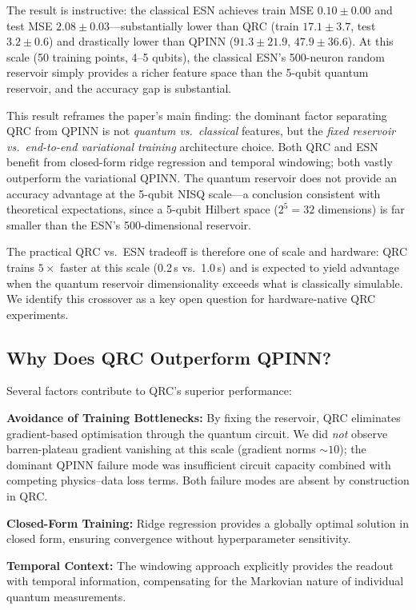 \documentclass[11pt,a4paper]{article}
\begin{document}
The result is instructive: the classical ESN achieves train MSE $0.10 \pm 0.00$ and test MSE $2.08 \pm 0.03$---substantially lower than QRC (train $17.1 \pm 3.7$, test $3.2 \pm 0.6$) and drastically lower than QPINN ($91.3 \pm 21.9$, $47.9 \pm 36.6$).
At this scale (50 training points, 4--5 qubits), the classical ESN's 500-neuron random reservoir simply provides a richer feature space than the 5-qubit quantum reservoir, and the accuracy gap is substantial.

This result reframes the paper's main finding: the dominant factor separating QRC from QPINN is not \emph{quantum vs.\ classical} features, but the \emph{fixed reservoir vs.\ end-to-end variational training} architecture choice.
Both QRC and ESN benefit from closed-form ridge regression and temporal windowing; both vastly outperform the variational QPINN.
The quantum reservoir does not provide an accuracy advantage at the 5-qubit NISQ scale---a conclusion consistent with theoretical expectations, since a 5-qubit Hilbert space ($2^5=32$ dimensions) is far smaller than the ESN's 500-dimensional reservoir.

The practical QRC vs.\ ESN tradeoff is therefore one of scale and hardware: QRC trains $5\times$ faster at this scale (0.2\,s vs.\ 1.0\,s) and is expected to yield advantage when the quantum reservoir dimensionality exceeds what is classically simulable. We identify this crossover as a key open question for hardware-native QRC experiments.

\subsection{Why Does QRC Outperform QPINN?}

Several factors contribute to QRC's superior performance:

\textbf{Avoidance of Training Bottlenecks:} By fixing the reservoir, QRC eliminates gradient-based optimisation through the quantum circuit. We did \emph{not} observe barren-plateau gradient vanishing at this scale (gradient norms $\sim\!10$); the dominant QPINN failure mode was insufficient circuit capacity combined with competing physics--data loss terms. Both failure modes are absent by construction in QRC.

\textbf{Closed-Form Training:} Ridge regression provides a globally optimal solution in closed form, ensuring convergence without hyperparameter sensitivity.

\textbf{Temporal Context:} The windowing approach explicitly provides the readout with temporal information, compensating for the Markovian nature of individual quantum measurements.
\end{document}
